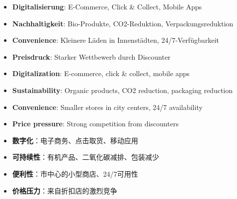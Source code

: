 \begin{otherlanguage}{ngerman}
\begin{itemize}
    \item \textbf{Digitalisierung}: E-Commerce, Click \& Collect, Mobile Apps
    \item \textbf{Nachhaltigkeit}: Bio-Produkte, CO2-Reduktion, Verpackungsreduktion
    \item \textbf{Convenience}: Kleinere Läden in Innenstädten, 24/7-Verfügbarkeit
    \item \textbf{Preisdruck}: Starker Wettbewerb durch Discounter
\end{itemize}
\end{otherlanguage}

\begin{itemize}
    \item \textbf{Digitalization}: E-commerce, click \& collect, mobile apps
    \item \textbf{Sustainability}: Organic products, CO2 reduction, packaging reduction
    \item \textbf{Convenience}: Smaller stores in city centers, 24/7 availability
    \item \textbf{Price pressure}: Strong competition from discounters
\end{itemize}

\begin{itemize}
    \item \textbf{数字化}：电子商务、点击取货、移动应用
    \item \textbf{可持续性}：有机产品、二氧化碳减排、包装减少
    \item \textbf{便利性}：市中心的小型商店、24/7可用性
    \item \textbf{价格压力}：来自折扣店的激烈竞争
\end{itemize}
